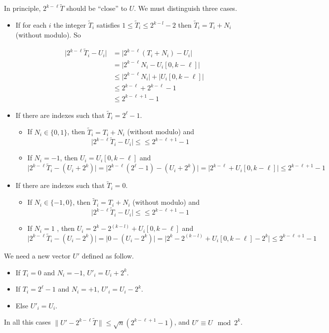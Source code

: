 \documentclass[submission,svgnames,journal=tosc]{iacrtrans}
\begin{document}
In principle, $2^{k-\ell} \widetilde{T}$ should be ``close'' to \(U\). We must distinguish three cases.
\begin{itemize}
	\item If for each \(i\) the integer \(\widetilde{T}_i\) satisfies \(1\leqslant\widetilde{T}_i\leqslant 2^{k-l}-2\) then \(\widetilde{T}_i = T_i + N_i\) (without modulo). So
	
	\begin{align*}
	\lvert 2^{k-\ell}\widetilde{T}_i-U_i \rvert &=\lvert 2^{k-\ell}(T_i + N_i)-U_i \rvert \\
	 &= \lvert 2^{k-\ell}N_i - U_i[0,k-\ell] \rvert\\
	 &\leqslant \lvert 2^{k-\ell}N_i\rvert + \lvert U_i[0,k-\ell] \rvert \\
	 &\leqslant 2^{k-\ell} + 2^{k-\ell}-1\\
	 &\leqslant 2^{k-\ell +1 }- 1
	\end{align*}
	
	\item If there are indexes such that \(\widetilde{T}_i = 2^\ell-1\).
	\begin{itemize}
		\item If \(N_i \in \{0,1\}\), then \(\widetilde{T}_i = T_i + N_i\) (without modulo) and \[\lvert 2^{k-\ell}\widetilde{T}_i-U_i \rvert \leqslant \leqslant 2^{k-\ell +1 }- 1\]
		\item If \(N_i = -1\), then \(U_i=U_i[0,k-\ell]\) and  \[\lvert 2^{k-\ell}\widetilde{T}_i-(U_i + 2^k) \rvert =\lvert 2^{k-\ell}(2^\ell -1) -(U_i + 2^k) \rvert = \lvert 2^{k-\ell} + U_i[0,k-\ell]\rvert \leqslant 2^{k-\ell + 1} -1 \]
	\end{itemize}

	\item If there are indexes such that \(\widetilde{T}_i = 0\).
	\begin{itemize}
		\item  If  \(N_i \in \{-1,0\}\), then \(\widetilde{T}_i = T_i + N_i\) (without modulo) and \[\lvert 2^{k-\ell}\widetilde{T}_i-U_i \rvert \leqslant \leqslant 2^{k-\ell +1 }- 1\]
		\item If \(N_i = 1\) , then \(U_i= 2^k-2^(k-l) + U_i[0,k-\ell]\) and  \[\lvert 2^{k-\ell}\widetilde{T}_i-(U_i - 2^k) \rvert =\lvert 0 -(U_i - 2^k) \rvert = \lvert 2^k-2^(k-l) + U_i[0,k-\ell] - 2^k\rvert \leqslant 2^{k-\ell + 1} -1 \]
	\end{itemize}
\end{itemize}
	We need a new vector \(U'\) defined as follow.
\begin{itemize}
	\item If \(T_i = 0\) and \(N_i = -1\), \(U'_i=U_i+2^k\).
	\item If \(T_i = 2^\ell - 1\) and \(N_i = +1\), \(U'_i=U_i-2^k\).
	\item Else \(U'_i=U_i\).
\end{itemize}
In all this cases \(\lVert U' -2^{k-\ell} \widetilde{T} \rVert \leqslant \sqrt{n}(2^{k-\ell+1}-1) \), and \(U' \equiv U \mod 2^k \).
\end{document}
